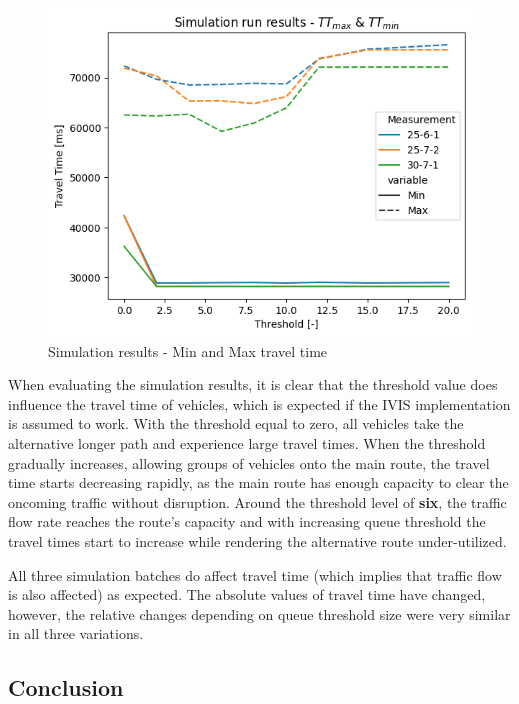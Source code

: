 \documentclass[main.tex]{subfiles}
\begin{document}
\begin{figure}[htbp]
    \centering
    \includegraphics[width=.8\textwidth]{MinMax.png}
    \caption{Simulation results - Min and Max travel time}
    \label{fig-sim-minmax}
\end{figure}

When evaluating the simulation results, it is clear that the threshold value does influence the
travel time of vehicles, which is expected if the IVIS implementation is assumed to work. With
the threshold equal to zero, all vehicles take the alternative longer path and experience large
travel times. When the threshold gradually increases, allowing groups of vehicles onto the 
main route, the travel time starts decreasing rapidly, as the main route has enough capacity to clear 
the oncoming traffic without disruption. Around the threshold level of \textbf{six}, the traffic flow 
rate reaches the route's capacity and with increasing queue threshold the travel times start to
increase while rendering the alternative route under-utilized.

All three simulation batches do affect travel time (which implies that traffic flow 
is also affected) as expected. The absolute values of travel time have changed, however, 
the relative changes depending on queue threshold size were very similar in all three 
variations.

\clearpage 

\subsection{Conclusion}
\end{document}

